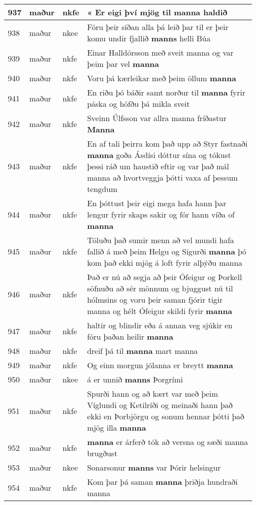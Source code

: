 \documentclass{article}
\begin{document}
\begin{longtable}{p{1cm}|p{1cm}|p{1cm}|p{13cm}}
\hline
937&maður&nkfe&« Er eigi því mjög til \textbf{manna} haldið\\
\hline
938&maður&nkee&Fóru þeir síðan alla þá leið þar til er þeir komu undir fjallið \textbf{manns} helli Búa\\
\hline
939&maður&nkfe&Einar Halldórsson með sveit manna og var þeim þar vel \textbf{manna} \\
\hline
940&maður&nkfe&Voru þá kærleikar með þeim öllum \textbf{manna} \\
\hline
941&maður&nkfe&En riðu þó báðir samt norður til \textbf{manna} fyrir páska og höfðu þá mikla sveit\\
\hline
942&maður&nkfe&Sveinn Úlfsson var allra manna fríðastur \textbf{Manna} \\
\hline
943&maður&nkfe&En af tali þeirra kom það upp að Styr fastnaði \textbf{manna} goða Ásdísi dóttur sína og tókust þessi ráð um haustið eftir og var það mál manna að hvortveggja þótti vaxa af þessum tengdum\\
\hline
944&maður&nkfe&En þóttust þeir eigi mega hafa hann þar lengur fyrir skaps sakir og fór hann víða of \textbf{manna} \\
\hline
945&maður&nkfe&Töluðu það sumir menn að vel mundi hafa fallið á með þeim Helgu og Sigurði \textbf{manna} þó kom það ekki mjög á loft fyrir alþýðu manna\\
\hline
946&maður&nkfe&Það er nú að segja að þeir Ófeigur og Þorkell söfnuðu að sér mönnum og bjuggust nú til hólmsins og voru þeir saman fjórir tigir manna og hélt Ófeigur skildi fyrir \textbf{manna} \\
\hline
947&maður&nkfe&haltir og blindir eða á annan veg sjúkir en fóru þaðan heilir \textbf{manna} \\
\hline
948&maður&nkfe&dreif þá til \textbf{manna} mart manna\\
\hline
949&maður&nkfe&Og einn morgun jólanna er breytt \textbf{manna} \\
\hline
950&maður&nkee&á er unnið \textbf{manns} Þorgrími\\
\hline
951&maður&nkfe&Spurði hann og að kært var með þeim Víglundi og Ketilríði og meinaði hann það ekki en Þorbjörgu og sonum hennar þótti það mjög illa \textbf{manna} \\
\hline
952&maður&nkfe& \textbf{manna} er árferð tók að versna og sæði manna brugðust\\
\hline
953&maður&nkee&Sonarsonur \textbf{manns} var Þórir helsingur\\
\hline
954&maður&nkfe&Kom þar þá saman \textbf{manna} þriðja hundraði manna\\

\end{longtable}
\end{document}

